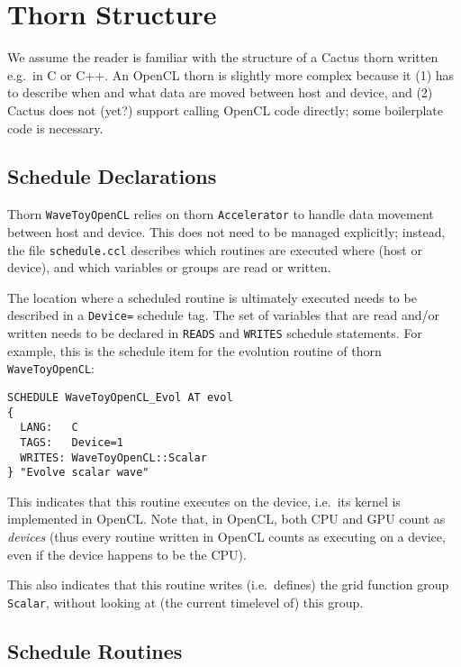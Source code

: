 \section{Thorn Structure}

We assume the reader is familiar with the structure of a Cactus thorn
written e.g.\ in C or C++. An OpenCL thorn is slightly more complex
because it (1) has to describe when and what data are moved between
host and device, and (2) Cactus does not (yet?) support calling OpenCL
code directly; some boilerplate code is necessary.

\subsection{Schedule Declarations}

Thorn \texttt{WaveToyOpenCL} relies on thorn \texttt{Accelerator} to
handle data movement between host and device. This does not need to be
managed explicitly; instead, the file \texttt{schedule.ccl} describes
which routines are executed where (host or device), and which
variables or groups are read or written.

The location where a scheduled routine is ultimately executed needs to
be described in a \texttt{Device=} schedule tag. The set of variables
that are read and/or written needs to be declared in \texttt{READS}
and \texttt{WRITES} schedule statements. For example, this is the
schedule item for the evolution routine of thorn
\texttt{WaveToyOpenCL}:

\begin{verbatim}
SCHEDULE WaveToyOpenCL_Evol AT evol
{
  LANG:   C
  TAGS:   Device=1
  WRITES: WaveToyOpenCL::Scalar
} "Evolve scalar wave"
\end{verbatim}

This indicates that this routine executes on the device, i.e.\ its
kernel is implemented in OpenCL\@. Note that, in OpenCL, both CPU and
GPU count as \emph{devices} (thus every routine written in OpenCL
counts as executing on a device, even if the device happens to be the
CPU\@).

This also indicates that this routine writes (i.e.\ defines) the grid
function group \texttt{Scalar}, without looking at (the current
timelevel of) this group.

\subsection{Schedule Routines}

